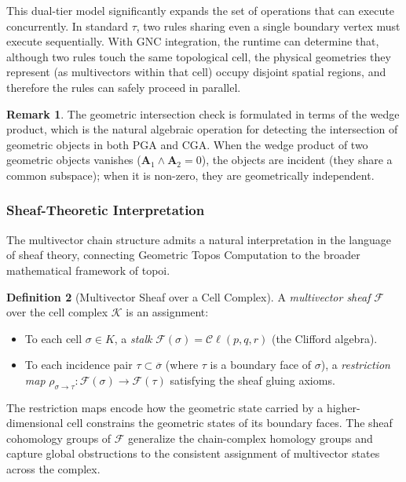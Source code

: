 \documentclass[manuscript, nonacm, review=false]{acmart}
\theoremstyle{definition}
\newtheorem{definition}{Definition}[section]
\newtheorem{remark}[definition]{Remark}
\theoremstyle{plain}
\newcommand{\Cl}{\mathcal{C}\!\ell}
\newcommand{\K}{\mathcal{K}}
\newcommand{\toposLang}{\ensuremath{\tau}\text{-Lang}}
\begin{document}
This dual-tier model significantly expands the set of operations that can execute concurrently. In standard \toposLang{}, two rules sharing even a single boundary vertex must execute sequentially. With GNC integration, the runtime can determine that, although two rules touch the same topological cell, the physical geometries they represent (as multivectors within that cell) occupy disjoint spatial regions, and therefore the rules can safely proceed in parallel.

\begin{remark}
The geometric intersection check is formulated in terms of the wedge product, which is the natural algebraic operation for detecting the intersection of geometric objects in both PGA and CGA. When the wedge product of two geometric objects vanishes ($\mathbf{A}_1 \wedge \mathbf{A}_2 = 0$), the objects are incident (they share a common subspace); when it is non-zero, they are geometrically independent.
\end{remark}


\subsubsection{Sheaf-Theoretic Interpretation}

The multivector chain structure admits a natural interpretation in the language of sheaf theory, connecting Geometric Topos Computation to the broader mathematical framework of topoi.

\begin{definition}[Multivector Sheaf over a Cell Complex]
\label{def:sheaf}
A \emph{multivector sheaf} $\mathcal{F}$ over the cell complex $\K$ is an assignment:
\begin{itemize}
    \item To each cell $\sigma \in K$, a \emph{stalk} $\mathcal{F}(\sigma) = \Cl(p,q,r)$ (the Clifford algebra).
    \item To each incidence pair $\tau \subset \overline{\sigma}$ (where $\tau$ is a boundary face of $\sigma$), a \emph{restriction map} $\rho_{\sigma \to \tau}: \mathcal{F}(\sigma) \to \mathcal{F}(\tau)$ satisfying the sheaf gluing axioms.
\end{itemize}
The restriction maps encode how the geometric state carried by a higher-dimensional cell constrains the geometric states of its boundary faces. The sheaf cohomology groups of $\mathcal{F}$ generalize the chain-complex homology groups and capture global obstructions to the consistent assignment of multivector states across the complex.
\end{definition}
\end{document}
